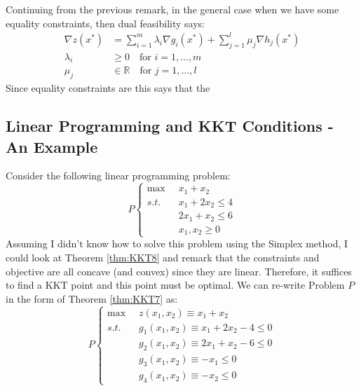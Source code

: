 \begin{remark} Continuing from the previous remark, in the general case when we have some equality constraints, then dual feasibility says:
\begin{displaymath}
\begin{aligned}
\nabla z({x}^*) &= \sum_{i = 1}^m\lambda_i \nabla g_i({x}^*) + \sum_{j = 1}^{l}\mu_j \nabla h_j({x}^*)\\
\lambda_i &\geq 0 \quad \text{for $i=1,\dots,m$}\\
\mu_j &\in \mathbb{R}\quad \text{for $j=1,\dots,l$}
\end{aligned}
\end{displaymath}
Since equality constraints are  this says that the  
\end{remark}

\subsection{Linear Programming and KKT Conditions - An Example}
Consider the following linear programming problem:
\begin{equation}
P \left \{
\begin{aligned}
\max \;\; & x_1 + x_2  \\ 
s.t. & x_1 + 2x_2 \leq 4\\
& 2x_1 + x_2 \leq 6\\
& x_1, x_2 \geq 0
\end{aligned} \right.
\end{equation}
Assuming I didn't know how to solve this problem using the Simplex method, I could look at Theorem \ref{thm:KKT8} and remark that the constraints and objective are all concave (and convex) since they are linear. Therefore, it suffices to find a KKT point and this point must be optimal.
We can re-write Problem $P$ in the form of Theorem \ref{thm:KKT7} as:
\begin{displaymath}
P \left \{
\begin{aligned}
\max \;\; & z(x_1,x_2) \equiv x_1 + x_2  \\ 
s.t. & g_1(x_1,x_2) \equiv x_1 + 2x_2 -4 \leq 0\\
& g_2(x_1,x_2) \equiv 2x_1 + x_2 - 6\leq 0\\
& g_3(x_1,x_2) \equiv -x_1 \leq 0\\
& g_4(x_1,x_2) \equiv -x_2 \leq 0
\end{aligned} \right.
\end{displaymath}

